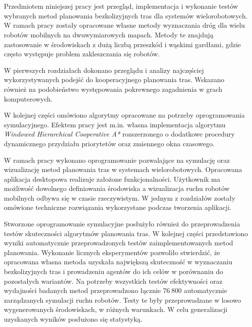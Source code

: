 \\

\\

\begin{singlespacing}

Przedmiotem niniejszej pracy jest przegląd, implementacja i wykonanie testów wybranych metod planowania bezkolizyjnych tras dla systemów wielorobotowych.
W ramach pracy zostały opracowane własne metody wyznaczania dróg dla wielu robotów mobilnych na dwuwymiarowych mapach.
Metody te znajdują zastosowanie w środowiskach z dużą liczbą przeszkód i wąskimi gardłami, gdzie często występuje problem zakleszczania się robotów.

W pierwszych rozdziałach dokonano przeglądu i analizy najczęściej wykorzystywanych podejść do kooperacyjnego planowania tras.
Wskazano również na podobieństwo występowania pokrewnego zagadnienia w grach komputerowych.

W kolejnej części omówiono algorytmy opracowane na potrzeby oprogramowania symulacyjnego.
Efektem pracy jest m.in. własna implementacja algorytmu {\it Windowed Hierarchical Cooperative A*} rozszerzonego o dodatkowe procedury dynamicznego przydziału priorytetów oraz zmiennego okna czasowego.

W ramach pracy wykonano oprogramowanie pozwalające na symulację oraz wizualizację metod planowania tras w systemach wielorobotowych.
Opracowana aplikacja desktopowa realizuje założone funkcjonalności.
Użytkownik ma możliwość dowolnego definiowania środowiska a wizualizacja ruchu robotów mobilnych odbywa się w czasie rzeczywistym.
W jednym z rozdziałów zostały omówione techniczne rozwiązania wykorzystane podczas tworzenia aplikacji.

Stworzone oprogramowanie symulacyjne posłużyło również do przeprowadzenia testów skuteczności algorytmów planowania tras.
W kolejnej części przedstawiono wyniki automatycznie przeprowadzonych testów zaimplementowanych metod planowania.
Wykonanie licznych eksperymentów pozwoliło stwierdzić, że opracowana własna metoda uzyskała największą skuteczność w wyznaczaniu bezkolizyjnych tras i prowadzeniu agentów do ich celów w porównaniu do pozostałych wariantów.
Na potrzeby wszystkich testów efektywności oraz wydajności badanych metod przeprowadzono łącznie $76\ 800$ automatycznie zarządzanych symulacji ruchu robotów.
Testy te były przeprowadzane w losowo wygenerowanych środowiskach, w różnych warunkach.
W celu generalizacji uzyskanych wyników posłużono się statystyką.



\end{singlespacing}
